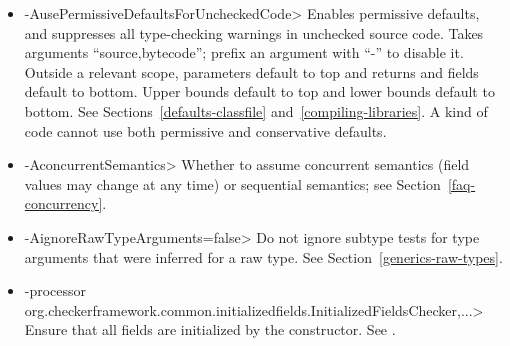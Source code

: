 \begin{itemize}
\begin{itemize}
   annotation, ``source'' specifies whether conservative
  default annotations are applied to source code and suppress all type-checking warnings; see
  Section~\ref{compiling-libraries}.
  \end{itemize}
\item \<-AusePermissiveDefaultsForUncheckedCode>
  Enables permissive defaults, and suppresses all type-checking warnings in unchecked source code.
  Takes arguments ``source,bytecode''; prefix an argument with ``-'' to disable it.
  Outside a relevant  scope, parameters default to
  top and returns and fields default to bottom.  Upper bounds default to top and lower bounds
  default to bottom.  See Sections~\ref{defaults-classfile} and~\ref{compiling-libraries}.
  A kind of code cannot use both permissive and conservative defaults.
\item \<-AconcurrentSemantics>
  Whether to assume concurrent semantics (field values may change at any
  time) or sequential semantics; see Section~\ref{faq-concurrency}.
\item \<-AignoreRawTypeArguments=false>
  Do not ignore subtype tests for type arguments that were inferred for a
  raw type.  See Section~\ref{generics-raw-types}.
\item \<-processor org.checkerframework.common.initializedfields.InitializedFieldsChecker,...>
  Ensure that all fields are initialized by the constructor.  See
  .
\end{itemize}

